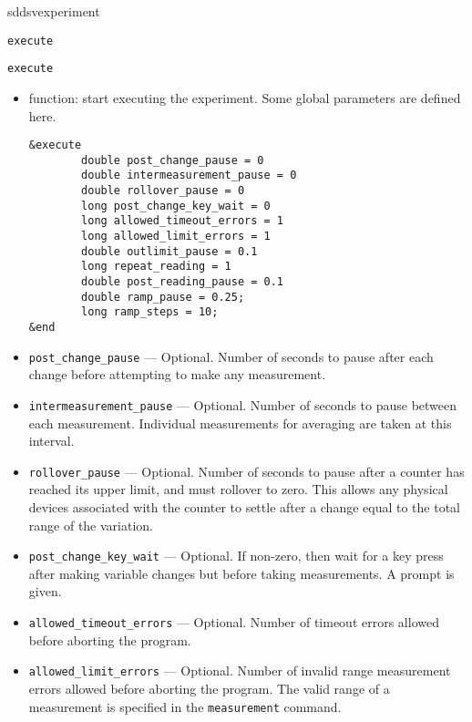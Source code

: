 \begin{sddsprog}{sddsvexperiment}
\begin{itemize}
\begin{latexonly}
\newpage\begin{center}{\Large \verb+execute+}\end{center}
\end{latexonly}
\begin{htmlonly}
\item {\Large \verb+execute+}
\end{htmlonly}
\begin{itemize}
   \item function: start executing the experiment. Some global parameters are defined here.
\begin{verbatim}
&execute
        double post_change_pause = 0
        double intermeasurement_pause = 0
        double rollover_pause = 0
        long post_change_key_wait = 0
        long allowed_timeout_errors = 1
        long allowed_limit_errors = 1
        double outlimit_pause = 0.1
        long repeat_reading = 1
        double post_reading_pause = 0.1
        double ramp_pause = 0.25;
        long ramp_steps = 10;
&end
\end{verbatim}
   \item {\verb+post_change_pause+} ---  Optional. Number of seconds to pause after each change before
      attempting to make any measurement.

   \item {\verb+intermeasurement_pause+} --- Optional. Number of
      seconds to pause between each measurement.  Individual
      measurements for averaging are taken at this interval.

   \item {\verb+rollover_pause+} --- Optional. Number of seconds to
      pause after a counter has reached its upper limit, and must
      rollover to zero. This allows any physical devices associated
      with the counter to settle after a change equal to the total
      range of the variation.

   \item {\verb+post_change_key_wait+} --- Optional. If non-zero, then
      wait for a key press after making variable changes but before
      taking measurements. A prompt is given.

   \item {\verb+allowed_timeout_errors+} --- Optional. Number of
      timeout errors allowed before aborting the program.

   \item {\verb+allowed_limit_errors+} --- Optional. Number of invalid
      range measurement errors allowed before aborting the
      program. The valid range of a measurement is specified in the
      {\verb+measurement+} command.


\end{itemize}
\end{itemize}
\end{sddsprog}

